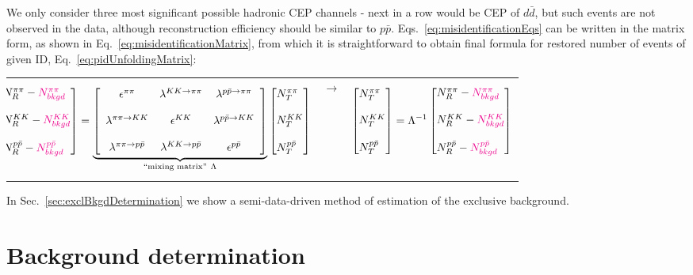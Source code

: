 We only consider three most significant possible hadronic CEP channels - next in a row would be CEP of $d\bar{d}$, but such events are not observed in the data, although reconstruction efficiency should be similar to $p\bar{p}$. Eqs.~\eqref{eq:misidentificationEqs} can be written in the matrix form, as shown in Eq.~\eqref{eq:misidentificationMatrix}, from which it is straightforward to obtain final formula for restored number of events of given ID, Eq.~\eqref{eq:pidUnfoldingMatrix}:

\begin{tabulary}{\textwidth}{LCL}
\begin{equation}\label{eq:misidentificationMatrix}\hspace*{-15pt}
\Spvek{N^{\pi\pi}_{R}-\textcolor{magenta}{N^{\pi\pi}_{bkgd}};~;N^{KK}_{R}-\textcolor{magenta}{N^{KK}_{bkgd}};~;N^{p\bar{p}}_{R}-\textcolor{magenta}{N^{p\bar{p}}_{bkgd}}} =  \underbrace{\left[ \begin{array}{ccc}
\epsilon^{\pi\pi} & \lambda^{ KK\rightarrow \pi\pi} & \lambda^{p\bar{p} \rightarrow \pi\pi} \\
~ & ~ & ~\\
\lambda^{\pi\pi\rightarrow KK} & \epsilon^{KK} & \lambda^{ p\bar{p} \rightarrow KK}\\
~ & ~ & ~\\
\lambda^{\pi\pi\rightarrow p\bar{p}} & \lambda^{ KK\rightarrow p\bar{p}} & \epsilon^{p\bar{p}}
\end{array} \right]}_{\text{``mixing matrix''}~\Lambda}\Spvek{N^{\pi\pi}_{T};~;N^{KK}_{T};~;N^{p\bar{p}}_{T}}
\end{equation}&%
\vspace{40pt}$\rightarrow$\hspace{20pt}&
\begin{equation}\label{eq:pidUnfoldingMatrix}
\Spvek{N^{\pi\pi}_{T};~;N^{KK}_{T};~;N^{p\bar{p}}_{T}} = \Lambda^{-1}\Spvek{N^{\pi\pi}_{R}-\textcolor{magenta}{N^{\pi\pi}_{bkgd}};~;N^{KK}_{R}-\textcolor{magenta}{N^{KK}_{bkgd}};~;N^{p\bar{p}}_{R}-\textcolor{magenta}{N^{p\bar{p}}_{bkgd}}}
\end{equation}
\end{tabulary}

In Sec.~\ref{sec:exclBkgdDetermination} we show a semi-data-driven method of estimation of the exclusive background.
 
 
\section{Background determination} 

